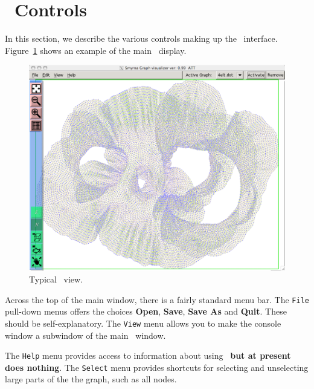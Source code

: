 \section{\smyrna\ Controls}
\label{sec:controls}

In this section, we describe the various controls making up 
the \smyrna\ interface. Figure~\ref{fig:main} shows an example of
the main \smyrna\ display.

\begin{figure}[ht] 
\begin{center}
\includegraphics[scale=.3]{figures/smyrna.png}
\caption{\small Typical \smyrna\ view.}
\label{fig:main} 
\end{center}
\end{figure}


Across the top of the main window, there is a fairly standard menu bar. 
The {\tt File} pull-down menus offers the choices {\bf Open}, {\bf Save},
{\bf Save As} and {\bf Quit}. These should be self-explanatory.
The {\tt View} menu allows you to make the console window a subwindow of the
main \smyrna\ window. 

The {\tt Help} menu provides access to information about using \smyrna\ {\bf but at
present does nothing}.
The {\tt Select} menu provides shortcuts for selecting and unselecting large parts
of the the graph, such as all nodes.

